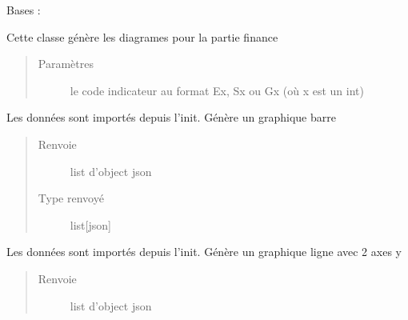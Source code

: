 \documentclass[letterpaper,10pt,french]{sphinxmanual}
\begin{document}
\begin{fulllineitems}
\label{\detokenize{app.home.content_gen:app.home.content_gen.graph_generation.FinancialChart}}
\sphinxAtStartPar
Bases : 

\sphinxAtStartPar
Cette classe génère les diagrames pour la partie finance
\begin{quote}\begin{description}
\item[{Paramètres}] \leavevmode
\sphinxAtStartPar
{} \textendash{} 
\sphinxAtStartPar
le code indicateur au format Ex, Sx ou Gx (où x est un int)


\end{description}\end{quote}

\begin{fulllineitems}
\label{\detokenize{app.home.content_gen:app.home.content_gen.graph_generation.FinancialChart.plot_bar}}
\sphinxAtStartPar
Les données sont importés depuis l’init. Génère un graphique barre
\begin{quote}\begin{description}
\item[{Renvoie}] \leavevmode
\sphinxAtStartPar
list d’object json

\item[{Type renvoyé}] \leavevmode
\sphinxAtStartPar
list{[}json{]}

\end{description}\end{quote}

\end{fulllineitems}


\begin{fulllineitems}
\label{\detokenize{app.home.content_gen:app.home.content_gen.graph_generation.FinancialChart.plot_mltpl_line}}
\sphinxAtStartPar
Les données sont importés depuis l’init. Génère un graphique ligne avec 2 axes y
\begin{quote}\begin{description}
\item[{Renvoie}] \leavevmode
\sphinxAtStartPar
list d’object json


\end{description}
\end{quote}
\end{fulllineitems}
\end{fulllineitems}
\end{document}
